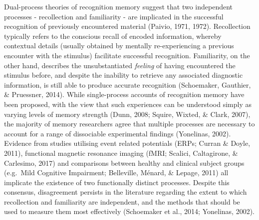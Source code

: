 \documentclass[
  11pt,
]{article}
\begin{document}
Dual-process theories of recognition memory suggest that two independent
processes - recollection and familiarity - are implicated in the
successful recognition of previously encountered material (Paivio, 1971,
1972). Recollection typically refers to the conscious recall of encoded
information, whereby contextual details (usually obtained by mentally
re-experiencing a previous encounter with the stimulus) facilitate
successful recognition. Familiarity, on the other hand, describes the
unsubstantiated \emph{feeling} of having encountered the stimulus
before, and despite the inability to retrieve any associated diagnostic
information, is still able to produce accurate recognition (Schoemaker,
Gauthier, \& Pruessner, 2014). While single-process accounts of
recognition memory have been proposed, with the view that such
experiences can be understood simply as varying levels of memory
strength (Dunn, 2008; Squire, Wixted, \& Clark, 2007), the majority of
memory researchers agree that multiple processes are necessary to
account for a range of dissociable experimental findings (Yonelinas,
2002). Evidence from studies utilising event related potentials (ERPs;
Curran \& Doyle, 2011), functional magnetic resonance imaging (fMRI;
Scalici, Caltagirone, \& Carlesimo, 2017) and comparisons between
healthy and clinical subject groups (e.g.~Mild Cognitive Impairment;
Belleville, Ménard, \& Lepage, 2011) all implicate the existence of two
functionally distinct processes. Despite this consensus, disagreement
persists in the literature regarding the extent to which recollection
and familiarity are independent, and the methods that should be used to
measure them most effectively (Schoemaker et al., 2014; Yonelinas,
2002).

~
\end{document}
